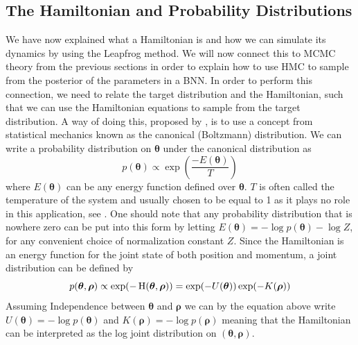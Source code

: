 \subsection{The Hamiltonian and Probability Distributions}
We have now explained what a Hamiltonian is and how we can simulate its dynamics by using the Leapfrog method. We will now connect this to MCMC theory from the previous sections in order to explain how to use HMC to sample from the posterior of the parameters in a BNN. In order to perform this connection, we need to relate the target distribution and the Hamiltonian, such that we can use the Hamiltonian equations to sample from the target distribution. A way of doing this, proposed by \cite{neal2012bayesian}, is to use a concept from statistical mechanics known as the canonical (Boltzmann) distribution. We can write a probability distribution on $\boldsymbol{\theta}$ under the canonical distribution as
\begin{equation*}
    p(\boldsymbol{\theta})\propto \exp\left(\frac{-E(\boldsymbol{\theta})}{T}\right)
\end{equation*}
where $E(\boldsymbol{\theta})$ can be any energy function defined over $\boldsymbol{\theta}$. $T$ is often called the temperature of the system and usually chosen to be equal to 1 as it plays no role in this application, see \cite{neal2012bayesian}.
One should note that any probability distribution that is nowhere zero can be put into this form by letting $E(\boldsymbol{\theta})=-\log p(\boldsymbol{\theta})-\log Z$, for any convenient choice of normalization constant $Z$. Since the Hamiltonian is an energy function for the joint state of both position and momentum, a joint distribution can be defined by
\begin{equation*}
p(\boldsymbol{\theta},\boldsymbol{\rho})\propto \exp(-\operatorname{H}(\boldsymbol{\theta},\boldsymbol{\rho}))   = \exp(-U(\boldsymbol{\theta}))\exp(-K(\boldsymbol{\rho}))
\end{equation*}
Assuming Independence between $\boldsymbol{\theta}$ and $\boldsymbol{\rho}$ we can by the equation above write $U(\boldsymbol{\theta})=-\log p(\boldsymbol{\theta})$ and $K(\boldsymbol{\rho})=-\log p(\boldsymbol{\rho})$ meaning that the Hamiltonian can be interpreted as the log joint distribution on $(\boldsymbol{\theta},\boldsymbol{\rho})$. 
\\
\\
